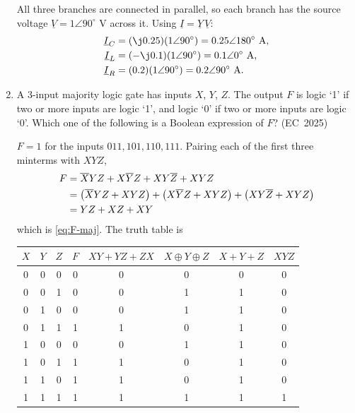 \begin{enumerate}[label=\thesubsection.\arabic*, ref=\thesubsection.\theenumi]
\solution
All three branches are connected in parallel, so each branch has the source voltage
$\underline{V}=1\angle90^\circ$ V across it. Using $\underline{I}=\underline{Y}\,\underline{V}$:
\begin{align}
\underline{I}_C&=(\j0.25)(1\angle90^\circ)
=0.25\angle180^\circ\text{ A},\\
\underline{I}_L&=(-\j0.1)(1\angle90^\circ)
=0.1\angle0^\circ\text{ A},\\
\underline{I}_R&=(0.2)(1\angle90^\circ)
=0.2\angle90^\circ\text{ A}.
\end{align}




\item
A 3-input majority logic gate has inputs $X$, $Y$, $Z$. The output $F$ is logic `1' if two or more inputs are logic `1', and logic `0' if two or more inputs are logic `0'. Which one of the following is a Boolean expression of $F$?
\hfill (EC~2025)
\begin{enumerate}
	\begin{multicols}{4}
    \item $XY+YZ+ZX$
    \item $X\oplus Y\oplus Z$
    \item $X+Y+Z$
    \item $XYZ$
    \end{multicols}
\end{enumerate}
\solution
$F=1$ for the inputs $011,101,110,111$. Pairing each of the first three minterms with $XYZ$,
\begin{align}
F&=\overline{X}YZ+X\overline{Y}Z+XY\overline{Z}+XYZ
\\
&=\left(\overline{X}YZ+XYZ\right)+\left(X\overline{Y}Z+XYZ\right)+\left(XY\overline{Z}+XYZ\right)
\\
&=YZ+XZ+XY
\end{align}
which is \eqref{eq:F-maj}. The truth table is
\begin{center}
\begin{tabular}{|c|c|c|c|c|c|c|c|}
\hline
$X$&$Y$&$Z$&$F$&$XY+YZ+ZX$&$X\oplus Y\oplus Z$&$X+Y+Z$&$XYZ$\\
\hline
0&0&0&0&0&0&0&0\\
0&0&1&0&0&1&1&0\\
0&1&0&0&0&1&1&0\\
0&1&1&1&1&0&1&0\\
1&0&0&0&0&1&1&0\\
1&0&1&1&1&0&1&0\\
1&1&0&1&1&0&1&0\\
1&1&1&1&1&1&1&1\\
\hline
\end{tabular}
\end{center}


\end{enumerate}
